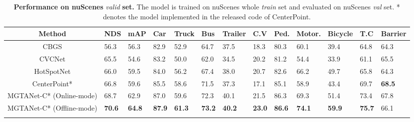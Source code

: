 \documentclass[letterpaper]{article} \usepackage{aaai23}  \usepackage{times}  \usepackage{helvet}  \usepackage{courier}  \usepackage[hyphens]{url}  \usepackage{graphicx} \urlstyle{rm} \def\UrlFont{\rm}  \usepackage{natbib}  \usepackage{caption} \frenchspacing  \setlength{\pdfpagewidth}{8.5in} \usepackage{algorithm}
\begin{document}

\renewcommand{\arraystretch}{1.0}

\begin{table*}[h]
\begin{center}

\begin{adjustbox}{width=0.95\textwidth}


\begin{tabular}{c || J  J |  J  J  J  J  J  J  J  J  J  J }
\Xhline{4\arrayrulewidth}



Method & NDS & mAP & Car & Truck
& Bus & Trailer & C.V & Ped. & Motor. & Bicycle & T.C & Barrier \\ \hline\hline



CBGS \cite{cbgs} & 56.3 & 56.3 & 82.9 & 52.9 & 64.7 & 37.5 & 18.3 & 80.3 & 60.1 & 39.4 & 64.8 & 64.3\\
CVCNet \cite{cvcnet} & 65.5 & 54.6 & 83.2 & 50.0 & 62.0 & 34.5 & 20.2 & 81.2 & 54.4 & 33.9 & 61.1 & 65.5\\
HotSpotNet \cite{hotspotnet} & 66.0 & 59.5 & 84.0 & 56.2 & 67.4 & 38.0 & 20.7 & 82.6 & 66.2 & 49.7 & 65.8 & 64.3\\
CenterPoint* \cite{centerpoint} & 66.8 & 59.6 & 85.5 & 58.6 & 71.5 & 37.3 & 17.1 & 85.1 & 58.9 & 43.4 & 69.7 & \textbf{68.5}\\



\hline
MGTANet-C* (Online-mode)  & 68.7 & 62.9 & 87.0 & 59.6 & 72.3 & 40.1 & 21.5 & 86.3 & 69.3 & 51.4 & 73.4 & 67.8\\
MGTANet-C* (Offline-mode)  & \textbf{70.6} & \textbf{64.8} & \textbf{87.9} & \textbf{61.3} & \textbf{73.2} & \textbf{40.2} & \textbf{23.0} & \textbf{86.6} & \textbf{74.1} & \textbf{59.9} & \textbf{75.7} & 66.1\\



\Xhline{4\arrayrulewidth}

\end{tabular}
\end{adjustbox}
\end{center}
\caption{\textbf{Performance on nuScenes} \textit{valid} \textbf{set.} The model is trained on nuScenes whole \textit{train} set and evaluated on nuScenes \textit{val} set. * denotes the model implemented in the released code of CenterPoint\cite{centerpoint}.}

\label{table:valid}
\end{table*}
\renewcommand{\arraystretch}{1}
 
\end{document}
